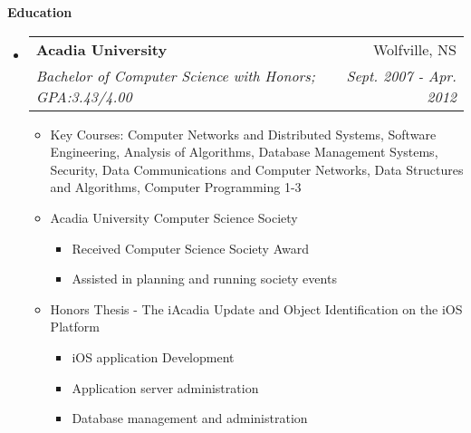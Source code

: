 \documentclass[letterpaper,11pt]{article}
\makeatletter
\newcommand{\resitem}[1]{\item #1 \vspace{-2pt}}
\newcommand{\resheading}[1]{{\large \colorbox{mygrey}{\begin{minipage}{\textwidth}{\textbf{#1 \vphantom{p\^{E}} }}\end{minipage}} }}
\newcommand{\ressubheading}[4]{
\begin{tabular*}{6.5in}{l@{\extracolsep{\fill}}r}
        \textbf{#1} & #2 \\
        \textit{#3} & \textit{#4} \\
\end{tabular*}\vspace{-6pt}}
\makeatother
\begin{document}
\begin{itemize}
\begin{comment}
                    \resitem{Employed organization skills in maintaining online database of cadet documentation to ensure easy and consistent transfer of data
                    between units and headquarters}
                    \resitem{Create and maintain paper documentation on every cadet to enter the unit}
                    \resitem{Teach classes to 12-18 year old youths}
                \end{itemize}
        \item[]
            \ressubheading{HMCS Acadia (DND)}{Cornwallis NS}{Boatswain Divisional Officer}{July - Aug. 2007-2009}
                \begin{itemize}
                    \resitem{Solely responsible for 25 cadets, ages 13-18 from 6:00am to 8:00pm}
                    \resitem{Documented training and performance in corps life in thorough reports for each individual cadet}
                    \resitem{Disciplined cadets to appropriate levels when required}
                    \resitem{Effectively communicated information within classes}
                    \resitem{Developed leadership skills of cadets}
                \end{itemize}
\end{comment}
    \end{itemize}  %

\resheading{Education} %
    \begin{itemize}
        \item[]
            \ressubheading{Acadia University}{Wolfville, NS}{{Bachelor of Computer Science with Honors}; {GPA:3.43/4.00}}{Sept. 2007 - Apr. 2012}
                \begin{itemize}
                    \resitem{Key Courses: Computer Networks and Distributed Systems, Software Engineering, Analysis of
                    Algorithms, Database Management Systems, Security, Data Communications and Computer Networks, Data
                    Structures and Algorithms, Computer Programming 1-3}
                    \resitem{Acadia University Computer Science Society}
                        \begin{itemize}
                            \resitem{Received Computer Science Society Award}
                            \resitem{Assisted in planning and running society events}
                        \end{itemize}
                    \resitem{Honors Thesis - The iAcadia Update and Object Identification on the iOS Platform}
                        \begin{itemize}
                            \resitem{iOS application Development}
                            \resitem{Application server administration}
                            \resitem{Database management and administration}
                        \end{itemize}
                \end{itemize}
    \end{itemize}
\end{document}
